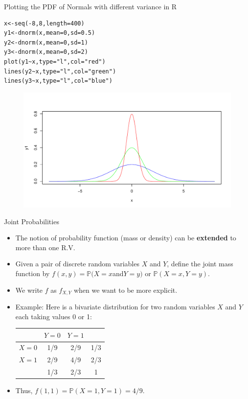 \documentclass[handout]{beamer}
\begin{document}
\begin{frame}[fragile]{Plotting the PDF of Normals with different variance in R}
\scriptsize{
\begin{verbatim}
x<-seq(-8,8,length=400)
y1<-dnorm(x,mean=0,sd=0.5)
y2<-dnorm(x,mean=0,sd=1) 
y3<-dnorm(x,mean=0,sd=2)
plot(y1~x,type="l",col="red")
lines(y2~x,type="l",col="green")
lines(y3~x,type="l",col="blue")
\end{verbatim}
}
 \begin{figure}[h!]
	\centering
	\includegraphics[scale=0.35]{pics/normplot.pdf}
\end{figure}



\end{frame}




\begin{frame}{Joint Probabilities}
\scriptsize{
\begin{itemize}
 \item The notion of probability function (mass or density) can be \textbf{extended} to more than one R.V.  
 \item Given a pair of discrete random variables $X$ and $Y$, define the joint mass function by $f(x,y) = \mathbb{P}(X = x $and$ Y = y)$ or $\mathbb{P}(X = x, Y = y)$.
 
 \item We write $f$ as $f_{X,Y}$ when we want to be more explicit.
 
 \item Example: Here is a bivariate distribution for two random variables $X$ and $Y$ each taking values 0 or 1:
 \begin{table}
\centering
 \begin{tabular}{c|cc|c}
& $Y=0$ & $Y=1$ & \\ \hline
$X=0$ & 1/9 & 2/9 & 1/3 \\
$X=1$ & 2/9 & 4/9 & 2/3 \\ \hline
& 1/3 & 2/3 & 1 \\
\end{tabular} 
\end{table} 
 
\item Thus, $f(1, 1) = \mathbb{P}(X = 1, Y = 1) = 4/9$. 
 


\end{itemize}

} 
\end{frame}
\end{document}
